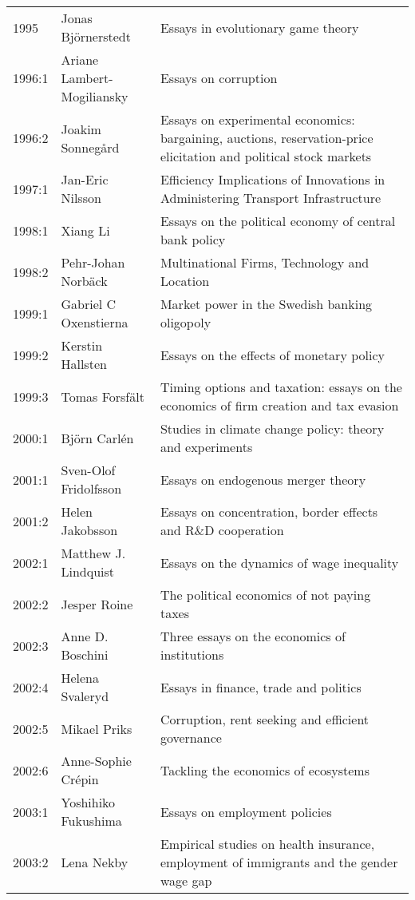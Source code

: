 {\begin{longtable}{p{} p{} p{}}
    1995 & Jonas Björnerstedt & Essays in evolutionary game theory \\
    1996:1 & \makecell[tl]{Ariane Lambert-\\Mogiliansky} & Essays on corruption \\
    1996:2 & Joakim Sonnegård & Essays on experimental economics: bargaining, auctions, reservation-price elicitation and political stock markets \\
    1997:1 & Jan-Eric Nilsson & Efficiency Implications of Innovations in Administering Transport Infrastructure \\
    1998:1 & Xiang Li & Essays on the political economy of central bank policy \\
    1998:2 & Pehr-Johan Norbäck & Multinational Firms, Technology and Location \\
    1999:1 & Gabriel C Oxenstierna & Market power in the Swedish banking oligopoly \\
    1999:2 & Kerstin Hallsten & Essays on the effects of monetary policy \\
    1999:3 & Tomas Forsfält & Timing options and taxation: essays on the economics of firm creation and tax evasion \\
    2000:1 & Björn Carlén & Studies in climate change policy: theory and experiments \\
    2001:1 & Sven-Olof Fridolfsson & Essays on endogenous merger theory \\
    2001:2 & Helen Jakobsson & Essays on concentration, border effects and R\&D cooperation \\
    2002:1 & Matthew J. Lindquist & Essays on the dynamics of wage inequality \\
    2002:2 & Jesper Roine & The political economics of not paying taxes \\
    2002:3 & Anne D. Boschini & Three essays on the economics of institutions \\
    2002:4 & Helena Svaleryd & Essays in finance, trade and politics \\
    2002:5 & Mikael Priks & Corruption, rent seeking and efficient governance \\
    2002:6 & Anne-Sophie Crépin & Tackling the economics of ecosystems \\
    2003:1 & Yoshihiko Fukushima & Essays on employment policies \\
    2003:2 & Lena Nekby & Empirical studies on health insurance, employment of immigrants and the gender wage gap \\

\end{longtable}}
